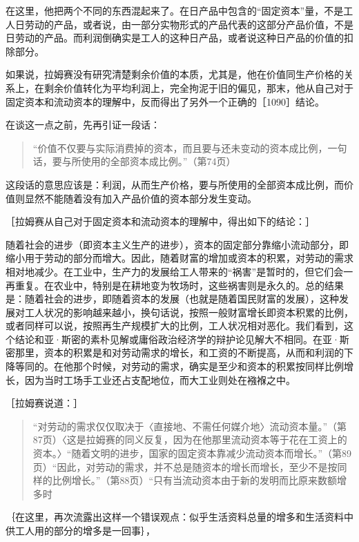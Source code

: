 在这里，他把两个不同的东西混起来了。在日产品中包含的“固定资本”量，不是工人日劳动的产品，或者说，由一部分实物形式的产品代表的这部分产品价值，不是日劳动的产品。而利润倒确实是工人的这种日产品，或者说这种日产品的价值的扣除部分。

如果说，拉姆赛没有研究清楚剩余价值的本质，尤其是，他在价值同生产价格的关系上，在剩余价值转化为平均利润上，完全拘泥于旧的偏见，那末，他从自己对于固定资本和流动资本的理解中，反而得出了另外一个正确的［1090］结论。

在谈这一点之前，先再引证一段话：

\begin{quote}{“价值不仅要与实际消费掉的资本，而且要与还未变动的资本成比例，一句话，要与所使用的全部资本成比例。”（第74页）}\end{quote}

这段话的意思应该是：利润，从而生产价格，要与所使用的全部资本成比例，而价值则显然不能随着没有加入产品价值的资本部分发生变动。

［拉姆赛从自己对于固定资本和流动资本的理解中，得出如下的结论：］

随着社会的进步（即资本主义生产的进步），资本的固定部分靠缩小流动部分，即缩小用于劳动的部分而增大。因此，随着财富的增加或资本的积累，对劳动的需求相对地减少。在工业中，生产力的发展给工人带来的“祸害”是暂时的，但它们会一再重复。在农业中，特别是在耕地变为牧场时，这些祸害则是永久的。总的结果是：随着社会的进步，即随着资本的发展（也就是随着国民财富的发展），这种发展对工人状况的影响越来越小，换句话说，按照一般财富增长即资本积累的比例，或者同样可以说，按照再生产规模扩大的比例，工人状况相对恶化。我们看到，这个结论和亚·斯密的素朴见解或庸俗政治经济学的辩护论见解大不相同。在亚·斯密那里，资本的积累是和对劳动需求的增长，和工资的不断提高，从而和利润的下降等同的。在他那个时候，对劳动的需求，确实是至少和资本的积累按同样比例增长，因为当时工场手工业还占支配地位，而大工业则处在襁褓之中。

［拉姆赛说道：］

\begin{quote}{“对劳动的需求仅仅取决于〈直接地、不需任何媒介地〉流动资本量。”（第87页）〈这是拉姆赛的同义反复，因为在他那里流动资本等于花在工资上的资本。〉“随着文明的进步，国家的固定资本靠减少流动资本而增长。”（第89页）“因此，对劳动的需求，并不总是随资本的增长而增长，至少不是按同样的比例增长。”（第88页）“只有当流动资本由于新的发明而比原来数额增多时}\end{quote}

｛在这里，再次流露出这样一个错误观点：似乎生活资料总量的增多和生活资料中供工人用的部分的增多是一回事｝，

